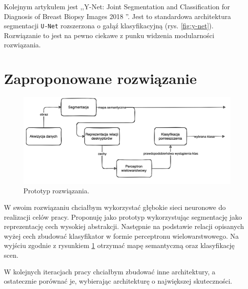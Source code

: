 Kolejnym artykułem jest ,,Y-Net: Joint Segmentation and Classification for Diagnosis of Breast Biopsy Images 2018 \cite{mehta2018net}''. Jest to standardowa architektura segmentacji \texttt{U-Net} rozszerzona o gałąź klasyfikacyjną (rys. \ref{fig:y-net}). Rozwiązanie to jest na pewno ciekawe z punku widzenia modularności rozwiązania.

\section{Zaproponowane rozwiązanie}
\begin{figure}[h]
    \includegraphics[width=\textwidth]{images/own-solution.png}
    \caption{Prototyp rozwiązania.}
    \label{fig:prototype}
\end{figure}
W swoim rozwiązaniu chciałbym wykorzystać głębokie sieci neuronowe do realizacji celów pracy. Proponuję jako prototyp wykorzystując segmentację jako reprezentację cech wysokiej abstrakcji. Następnie na podstawie relacji opisanych wyżej cech zbudować klasyfikator w formie perceptronu wielowarstwowego. Na wyjściu zgodnie z rysunkiem \ref{fig:prototype} otrzymać mapę semantyczną oraz klasyfikację scen.

W kolejnych iteracjach pracy chciałbym zbudować inne architektury, a ostatecznie porównać je, wybierając architekturę o największej skuteczności.